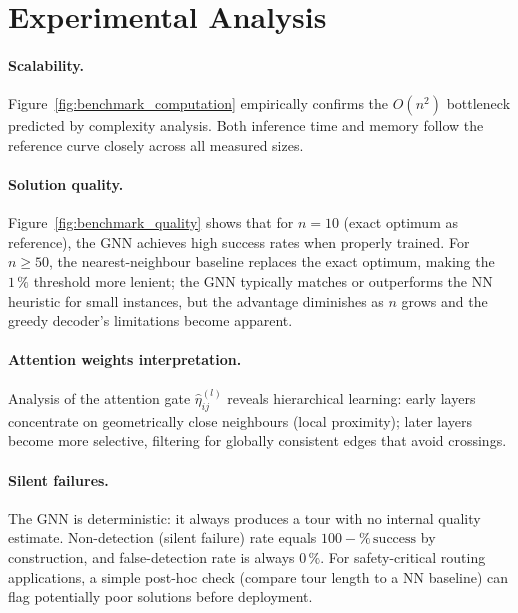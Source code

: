 \documentclass[12pt,a4paper]{article}
\begin{document}
\section{Experimental Analysis}

\paragraph{Scalability.}
Figure~\ref{fig:benchmark_computation} empirically confirms the $O(n^2)$
bottleneck predicted by complexity analysis.
Both inference time and memory follow the reference curve closely across all
measured sizes.

\paragraph{Solution quality.}
Figure~\ref{fig:benchmark_quality} shows that for $n = 10$ (exact optimum as
reference), the GNN achieves high success rates when properly trained.
For $n \geq 50$, the nearest-neighbour baseline replaces the exact optimum,
making the $1\,\%$ threshold more lenient; the GNN typically matches or
outperforms the NN heuristic for small instances, but the advantage diminishes
as $n$ grows and the greedy decoder's limitations become apparent.

\paragraph{Attention weights interpretation.}
Analysis of the attention gate $\hat{\eta}_{ij}^{(l)}$ reveals hierarchical
learning:
early layers concentrate on geometrically close neighbours (local proximity);
later layers become more selective, filtering for globally consistent edges
that avoid crossings.

\paragraph{Silent failures.}
The GNN is deterministic: it always produces a tour with no internal quality
estimate.
Non-detection (silent failure) rate equals $100 - \%\,\text{success}$ by
construction, and false-detection rate is always $0\,\%$.
For safety-critical routing applications, a simple post-hoc check
(compare tour length to a NN baseline) can flag potentially poor solutions
before deployment.
\end{document}
